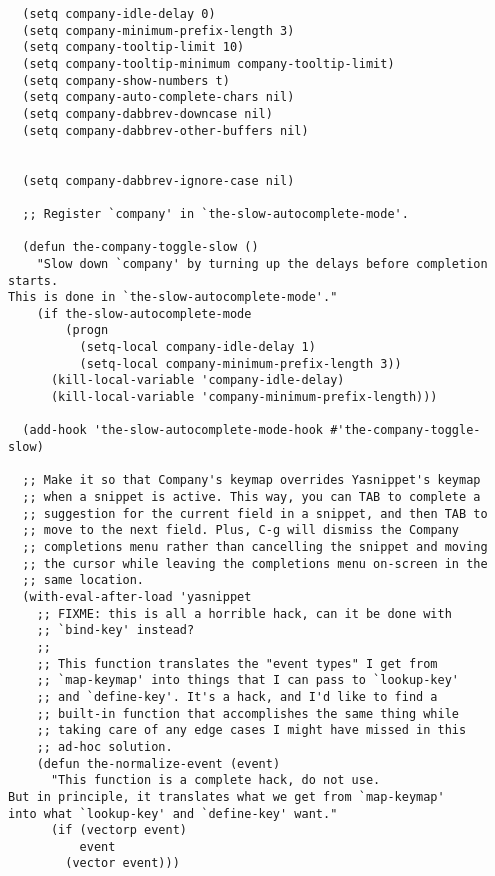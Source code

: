 \documentclass[11pt]{article}
\begin{document}
\begin{verbatim}
  (setq company-idle-delay 0)
  (setq company-minimum-prefix-length 3)
  (setq company-tooltip-limit 10)
  (setq company-tooltip-minimum company-tooltip-limit)
  (setq company-show-numbers t)
  (setq company-auto-complete-chars nil)
  (setq company-dabbrev-downcase nil)
  (setq company-dabbrev-other-buffers nil)


  (setq company-dabbrev-ignore-case nil)

  ;; Register `company' in `the-slow-autocomplete-mode'.

  (defun the-company-toggle-slow ()
    "Slow down `company' by turning up the delays before completion starts.
This is done in `the-slow-autocomplete-mode'."
    (if the-slow-autocomplete-mode
        (progn
          (setq-local company-idle-delay 1)
          (setq-local company-minimum-prefix-length 3))
      (kill-local-variable 'company-idle-delay)
      (kill-local-variable 'company-minimum-prefix-length)))

  (add-hook 'the-slow-autocomplete-mode-hook #'the-company-toggle-slow)

  ;; Make it so that Company's keymap overrides Yasnippet's keymap
  ;; when a snippet is active. This way, you can TAB to complete a
  ;; suggestion for the current field in a snippet, and then TAB to
  ;; move to the next field. Plus, C-g will dismiss the Company
  ;; completions menu rather than cancelling the snippet and moving
  ;; the cursor while leaving the completions menu on-screen in the
  ;; same location.
  (with-eval-after-load 'yasnippet
    ;; FIXME: this is all a horrible hack, can it be done with
    ;; `bind-key' instead?
    ;;
    ;; This function translates the "event types" I get from
    ;; `map-keymap' into things that I can pass to `lookup-key'
    ;; and `define-key'. It's a hack, and I'd like to find a
    ;; built-in function that accomplishes the same thing while
    ;; taking care of any edge cases I might have missed in this
    ;; ad-hoc solution.
    (defun the-normalize-event (event)
      "This function is a complete hack, do not use.
But in principle, it translates what we get from `map-keymap'
into what `lookup-key' and `define-key' want."
      (if (vectorp event)
          event
        (vector event)))


\end{verbatim}
\end{document}

